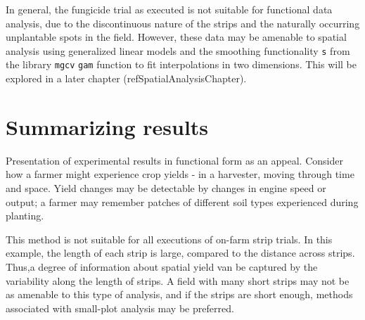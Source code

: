 \documentclass[phdcss]{SDSUThesis}
\begin{document}
In general, the fungicide trial as executed is not suitable for functional data analysis, due to the discontinuous nature of the strips and the naturally occurring unplantable spots in the field. However, these data may be amenable to spatial analysis using generalized linear models and the smoothing functionality \texttt{s} from the library \texttt{mgcv} \texttt{gam} function to fit interpolations in two dimensions. This will be explored in a later chapter (ref{SpatialAnalysisChapter}).


\clearpage

\section{Summarizing results}

Presentation of experimental results in functional form as an appeal. Consider how a farmer might experience crop yields - in a harvester, moving through time and space. Yield changes may be detectable by changes in engine speed or output; a farmer may remember patches of different soil types experienced during planting. 

This method is not suitable for all executions of on-farm strip trials. In this example, the length of each strip is large, compared to the distance across strips. Thus,a degree of information about spatial yield van be captured by the variability along the length of strips. A field with many short strips may not be as amenable to this type of analysis, and if the strips are short enough, methods associated with small-plot analysis may be preferred.
\end{document}
